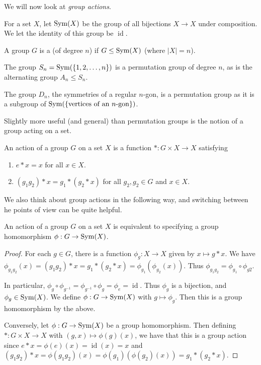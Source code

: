 \documentclass[a4paper]{scrreprt}
\begin{document}
We will now look at \emph{group actions}.

\begin{definition}
	For a set $X$, let $\operatorname{Sym}(X)$ be the group of all bijections $X \rightarrow X$ under composition. We let the identity of this group be $\operatorname{id}$.
\end{definition}

\begin{definition}
	A group $G$ is a  (of degree $n$) if $G \leq \operatorname{Sym}(X)$ (where $|X| = n$).
\end{definition}

\begin{example}
	The group $S_n = \operatorname{Sym}(\{1, 2, \dots, n\})$ is a permutation group of degree $n$, as is the alternating group $A_n \leq S_n$.

	The group $D_n$, the symmetries of a regular $n$-gon, is a permutation group as it is a subgroup of $\operatorname{Sym}(\{\text{vertices of an $n$-gon}\})$.
\end{example}

Slightly more useful (and general) than permutation groups is the notion of a group acting on a set.

\begin{definition}
	An action of a group $G$ on a set $X$ is a function $*: G \times X \rightarrow X$ satisfying
	\begin{enumerate}[label=(\roman*)]
		\item $e * x = x$ for all $x \in X$.
		\item $(g_1 g_2) * x = g_1 * (g_2 * x)$ for all $g_2, g_2 \in G$ and $x \in X$.
	\end{enumerate}
\end{definition}

We also think about group actions in the following way, and switching between he points of view can be quite helpful.

\begin{proposition}
	An action of a group $G$ on a set $X$ is equivalent to specifying a group homomorphism $\phi: G \rightarrow \operatorname{Sym}(X)$.
\end{proposition}
\begin{proof}
	For each $g \in G$, there is a function $\phi_g : X \rightarrow X$ given by $x \mapsto g * x$. We have $\phi_{g_1 g_2}(x) = (g_1 g_2) * x = g_1 * (g_2 * x) = \phi_{g_1} (\phi_{g_2}(x))$. Thus $\phi_{g_1 g_2} = \phi_{g_1} \circ \phi_{g2}$.
	
	In particular, $\phi_g \circ \phi_{g^{-1}} = \phi_{g^{-1}} \circ \phi_g = \phi_e = \operatorname{id}$. Thus $\phi_g$ is a bijection, and $\phi_g \in \operatorname{Sym}(X)$. We define $\phi : G \rightarrow \operatorname{Sym}(X)$ with $g \mapsto \phi_g$. Then this is a group homomorphism by the above.
	
	Conversely, let $\phi : G \rightarrow \operatorname{Sym}(X)$ be a group homomorphism. Then defining $*: G \times X \rightarrow X$ with $(g, x) \mapsto \phi(g)(x)$, we have that this is a group action since $e * x = \phi(e)(x) = \operatorname{id}(x) = x$ and $(g_1 g_2) * x = \phi(g_1 g_2)(x) = \phi(g_1)(\phi(g_2)(x)) = g_1 * (g_2 * x)$.
\end{proof}
\end{document}
